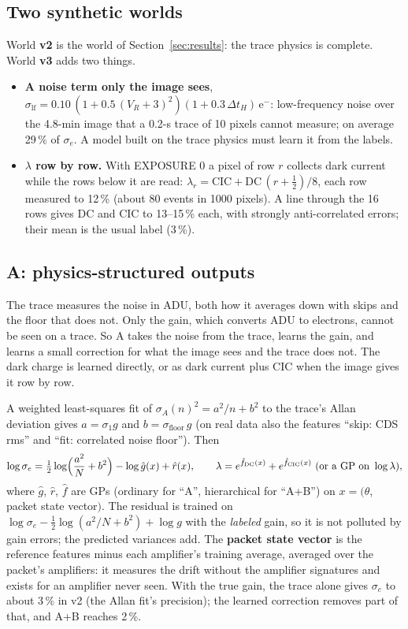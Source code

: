 \documentclass[10pt]{article}
\begin{document}
\subsection{Two synthetic worlds}
World \textbf{v2} is the world of Section~\ref{sec:results}: the trace physics is complete. World \textbf{v3} adds two things.
\begin{itemize}
\item \textbf{A noise term only the image sees}, $\sigma_\text{lf} = 0.10\,(1 + 0.5\,(V_R+3)^2)(1 + 0.3\,\Delta t_H)$\,e$^-$: low-frequency
  noise over the 4.8-min image that a 0.2-s trace of 10 pixels cannot measure; on average 29\,\% of $\sigma_e$. A model built on the
  trace physics must learn it from the labels.
\item \textbf{$\lambda$ row by row.} With EXPOSURE 0 a pixel of row $r$ collects dark current while the rows below it are read:
  $\lambda_r = \text{CIC} + \text{DC}\,(r+\tfrac12)/8$, each row measured to 12\,\% (about 80 events in 1000 pixels). A line through the
  16 rows gives DC and CIC to 13--15\,\% each, with strongly anti-correlated errors; their mean is the usual label (3\,\%).
\end{itemize}

\subsection{A: physics-structured outputs}
\begin{basic}
The trace measures the noise in ADU, both how it averages down with skips and the floor that does not. Only the gain, which converts ADU to
electrons, cannot be seen on a trace. So A takes the noise from the trace, learns the gain, and learns a small correction for what
the image sees and the trace does not. The dark charge is learned directly, or as dark current plus CIC when the image gives it
row by row.
\end{basic}
\begin{advanced}
A weighted least-squares fit of $\sigma_A(n)^2 = a^2/n + b^2$ to the trace's Allan deviation gives $a = \sigma_1 g$ and
$b = \sigma_\text{floor}\,g$ (on real data also the features ``skip: CDS rms'' and ``fit: correlated noise floor''). Then
\begin{equation}
\log\sigma_e = \tfrac12\log\Bigl(\frac{a^2}{N} + b^2\Bigr) - \log\hat g(x) + \hat r(x),\qquad
\lambda = e^{\hat f_\text{DC}(x)} + e^{\hat f_\text{CIC}(x)} \ \text{(or a GP on }\log\lambda),
\end{equation}
where $\hat g$, $\hat r$, $\hat f$ are GPs (ordinary for ``A'', hierarchical for ``A+B'') on $x = (\theta$, packet state vector$)$. The
residual is trained on $\log\sigma_e - \tfrac12\log(a^2/N+b^2) + \log g$ with the \emph{labeled} gain, so it is not polluted by gain
errors; the predicted variances add. The \textbf{packet state vector} is the reference features minus each amplifier's training average,
averaged over the packet's amplifiers: it measures the drift without the amplifier signatures and exists for an amplifier never seen.
With the true gain, the trace alone gives $\sigma_e$ to about 3\,\% in v2 (the Allan fit's precision); the learned correction
removes part of that, and A+B reaches 2\,\%.
\end{advanced}
\end{document}
